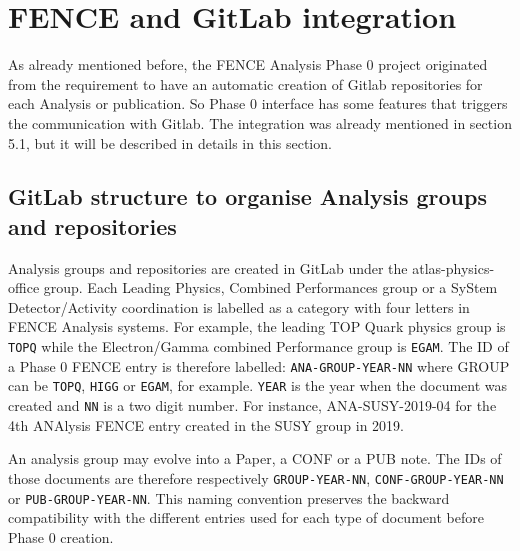 
\section{FENCE and GitLab integration}%
\label{sec:FENCE_and_Gitlab_integration}

As already mentioned before, the FENCE Analysis Phase 0 project originated from the requirement to have an automatic creation of Gitlab repositories for each Analysis or publication. So Phase 0 interface has some features that triggers the communication with Gitlab. The integration was already mentioned in section 5.1, but it will be described in details in this section.

\subsection{GitLab structure to organise Analysis groups and repositories}%
\label{sec:Gitlab_structure_to_organise_Analysis_groups_and_repositories}

Analysis groups and repositories are created in GitLab under the atlas-physics-office group. Each Leading Physics, Combined Performances group or a SyStem Detector/Activity coordination is labelled as a category with four letters in FENCE Analysis systems.
For example, the leading TOP Quark physics group is \texttt{TOPQ} while the Electron/Gamma combined Performance group is \texttt{EGAM}. The ID of a Phase 0 FENCE entry is therefore labelled: \texttt{ANA-GROUP-YEAR-NN} where GROUP can be \texttt{TOPQ}, \texttt{HIGG} or \texttt{EGAM}, for example.
\texttt{YEAR} is the year when the document was created and \texttt{NN} is a two digit number.
For instance, ANA-SUSY-2019-04 for the 4th ANAlysis FENCE entry created in the SUSY group in 2019.
                    
An analysis group may evolve into a Paper, a CONF or a PUB note. The IDs of those documents are therefore respectively \texttt{GROUP-YEAR-NN}, \texttt{CONF-GROUP-YEAR-NN} or \texttt{PUB-GROUP-YEAR-NN}.
This naming convention preserves the backward compatibility with the different entries used for each type of document before Phase 0 creation.

